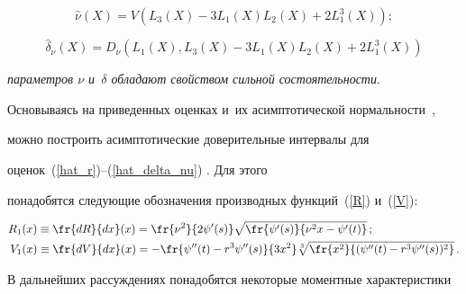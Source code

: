 \begin{equation}


\label{hat_nu}


{\hat \nu}(X)=


V\left(L_3(X)-3L_1(X)L_2(X)+2L_1^3(X)\right);


\end{equation}


\begin{equation}


\label{hat_delta_nu}


{\hat \delta}_\nu(X)=


D_\nu\left(L_1(X),L_3(X)-3L_1(X)L_2(X)+2L_1^3(X)\right)


\end{equation}


\textit{параметров $\nu$ и~$\delta$ обладают свойством сильной состоятельности}.








\smallskip





Основываясь на приведенных оценках и~их асимптотической нор\-маль\-ности~\cite{KuShe2021}, 


можно построить асимптотические доверительные интервалы для 


оценок~(\ref{hat_r})--(\ref{hat_delta_nu}) \cite{KuShe2021}. Для этого 


понадобятся сле\-ду\-ющие обозначения производных функций~(\ref{R}) и~(\ref{V}):


\begin{align}


\label{d_R_d_x}


R_1(x)&\equiv\fr{dR}{dx}(x)=


\fr{\nu^2}{2\psi'(s)}\sqrt{\fr{\psi'(s)}{\nu^2x-{\psi'(t)}}}\,;


\\


\label{d_V_d_x}


V_1(x)&\equiv\fr{dV}{dx}(x)=


-\fr{\psi''(t)-r^3\psi''(s)}{3x^2}\sqrt[3]{\fr{x^2}{(\psi''(t)-r^3\psi''(s))^2}}\,.


\end{align}





В дальнейших рассуждениях понадобятся некоторые моментные характеристики 



